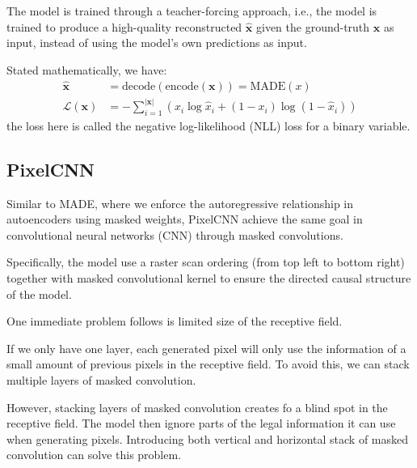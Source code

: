 \documentclass{mytufte-light}
\begin{document}
The model is trained through a teacher-forcing approach, 
i.e., the model is trained to produce a high-quality reconstructed \( \mathbf{\hat x}\) 
given the ground-truth \( \textbf{x} \) as input, instead of using the model's own predictions as input.

Stated mathematically, we have:
\begin{align}
    \mathbf{\hat x} &= \text{decode}(\text{encode}(\mathbf{x})) = \text{MADE}(x)\\
    \mathcal{L}(\mathbf{x}) &= -\sum_{i=1}^{|\mathbf{x}|}\left(
        x_i \log \hat x_i + (1-x_i) \log (1-\hat x_i)
    \right)
\end{align}
the loss here is called the negative log-likelihood (NLL) loss for a binary variable.

\subsection{PixelCNN}
Similar to MADE, where we enforce the autoregressive relationship in autoencoders using masked weights,
PixelCNN achieve the same goal in convolutional neural networks (CNN) through masked convolutions.

Specifically, the model use a raster scan ordering (from top left to bottom right)
together with masked convolutional kernel to ensure the directed causal structure of the model.


One immediate problem follows is limited size of the receptive field.

If we only have one layer, each generated pixel will only 
use the information of a small amount of previous pixels in the 
receptive field. 
To avoid this, we can stack multiple layers of masked convolution.

However, stacking layers of masked convolution creates fo a blind spot in the receptive field.
The model then ignore parts of the legal information it can use when generating pixels.
Introducing both vertical and horizontal stack of masked convolution can solve this problem.
\end{document}
